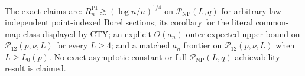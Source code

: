 The exact claims are: \(R_n^{\mathrm{PI}}\gtrsim(\log n/n)^{1/4}\) on \(\mathcal P_{\mathrm{NP}}(L,q)\) for arbitrary law-independent point-indexed Borel sections; its corollary for the literal common-map class displayed by CTY; an explicit \(O(a_n)\) outer-expected upper bound on \(\mathcal P_{12}(p,\nu,L)\) for every \(L\geq4\); and a matched \(a_n\) frontier on \(\mathcal P_{12}(p,\nu,L)\) when \(L\geq L_0(p)\).  No exact asymptotic constant or full-\(\mathcal P_{\mathrm{NP}}(L,q)\) achievability result is claimed.